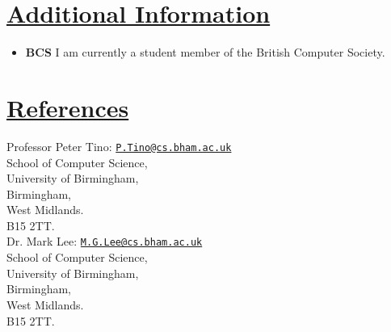 \documentclass[11pt]{article}
\begin{document}
	\vspace{-20pt}
	\hspace{-100pt}\section*{\underline{Additional Information}}
		\begin{itemize}
			\item \textbf{BCS} I am currently a student member of the British Computer Society.
		\end{itemize}

				
	\vspace{-20pt}
	\hspace{-100pt}\section*{\underline{References}}	
				\begin{multicols}{2}
					\noindent
					Professor Peter Tino:  \href{mailto:P.Tino@cs.bham.ac.uk}{\nolinkurl{P.Tino@cs.bham.ac.uk}}\\
					School of Computer Science,\\
					University of Birmingham,\\
					Birmingham, \\
					West Midlands.\\
					B15 2TT.\\
	
					\noindent
					Dr. Mark Lee: \href{mailto:M.G.Lee@cs.bham.ac.uk}{\nolinkurl{M.G.Lee@cs.bham.ac.uk}}\\
					School of Computer Science,\\
					University of Birmingham,\\
					Birmingham,\\
					West Midlands.\\
					B15 2TT.\\
				\end{multicols}
\end{document}
